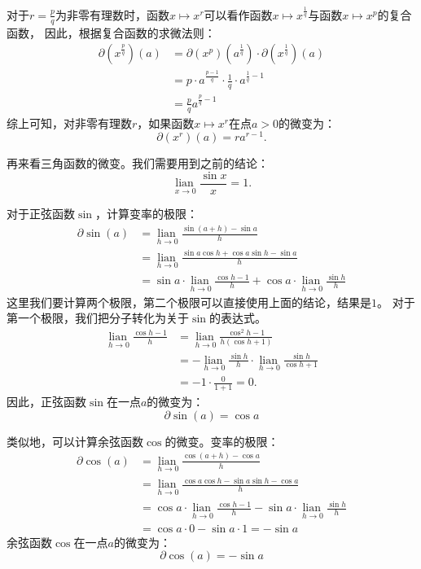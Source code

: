 \documentclass[12pt,UTF8]{ctexbook}
\newcommand{\lian}[1]{
    \underset{#1}{\operatorname{lian}\,}
}
\begin{document}
对于$r = \frac{p}{q}$为非零有理数时，函数$x \mapsto x^r$可以看作函数$x \mapsto x^{\frac{1}{q}}$与函数$x \mapsto x^{p}$的复合函数，
因此，根据复合函数的求微法则：
\begin{align*}
    \partial (x^{\frac{p}{q}}) (a) &= \partial (x^p) (a^{\frac{1}{q}}) \cdot \partial (x^{\frac{1}{q}}) (a)  \\
    &= p \cdot a^{\frac{p - 1}{q}} \cdot \frac{1}{q} \cdot a^{\frac{1}{q} - 1}  \\
    &= \frac{p}{q} a^{\frac{p}{q} - 1}     
\end{align*}
综上可知，对非零有理数$r$，如果函数$x \mapsto x^r$在点$a>0$的微变为：
$$ \partial (x^r) (a) = r a^{r-1}. $$

再来看三角函数的微变。我们需要用到之前的结论：
$$ \lian{x\to 0} \frac{\sin{x}}{x} = 1.$$

对于正弦函数$\sin$，计算变率的极限：
\begin{align*}
    \partial \sin(a) &= \lian{h\to 0} \frac{\sin{(a + h)} - \sin{a}}{h}  \\
    &= \lian{h\to 0} \frac{\sin{a}\cos{h} + \cos{a}\sin{h} - \sin{a}}{h}  \\
    &= \sin{a} \cdot \lian{h\to 0} \frac{\cos{h} - 1}{h} + \cos{a} \cdot \lian{h\to 0}\frac{\sin{h}}{h} 
\end{align*}
这里我们要计算两个极限，第二个极限可以直接使用上面的结论，结果是$1$。
对于第一个极限，我们把分子转化为关于$\sin$的表达式。
\begin{align*}
    \lian{h\to 0} \frac{\cos{h} - 1}{h} &= \lian{h\to 0} \frac{\cos^2{h} - 1}{h(\cos{h} + 1)}  \\
    &= -\lian{h\to 0} \frac{\sin{h}}{h} \cdot \lian{h\to 0} \frac{\sin{h}}{\cos{h} + 1}  \\
    &= -1 \cdot \frac{0}{1 + 1} = 0.  
\end{align*}
因此，正弦函数$\sin$在一点$a$的微变为：
$$ \partial \sin(a) = \cos{a} $$

类似地，可以计算余弦函数$\cos$的微变。变率的极限：
\begin{align*}
    \partial \cos(a) &= \lian{h\to 0} \frac{\cos{(a + h)} - \cos{a}}{h}  \\
    &= \lian{h\to 0} \frac{\cos{a}\cos{h} - \sin{a}\sin{h} - \cos{a}}{h}  \\
    &= \cos{a} \cdot \lian{h\to 0} \frac{\cos{h} - 1}{h} - \sin{a} \cdot\lian{h\to 0}\frac{\sin{h}}{h}  \\
    &= \cos{a} \cdot 0 - \sin{a} \cdot 1 = -\sin{a} 
\end{align*}
余弦函数$\cos$在一点$a$的微变为：
$$ \partial \cos(a) = -\sin{a} $$
\end{document}
